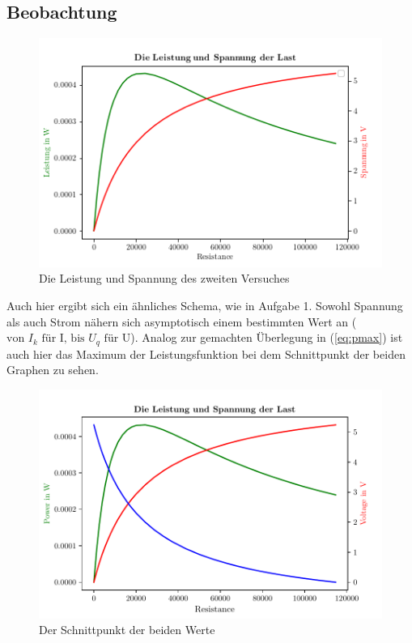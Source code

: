 \documentclass{scrarticle}
\begin{document}
\subsection{Beobachtung}
\begin{figure}
  \begin{center}
  \includegraphics[scale=0.5]{pw_volt2.png}
  \caption{Die Leistung und Spannung des zweiten Versuches}
  \end{center}
\end{figure}
Auch hier ergibt sich ein ähnliches Schema, wie in Aufgabe 1. Sowohl Spannung als auch Strom nähern sich asymptotisch einem bestimmten Wert an ($\text{von }I_k\text{ für I, bis }U_q\text{ für U}$).
Analog zur gemachten Überlegung in (\ref{eq:pmax}) ist auch hier das Maximum der Leistungsfunktion bei dem Schnittpunkt der beiden Graphen zu sehen.
\begin{figure}
  \begin{center}
\includegraphics[scale=0.5]{pw_volt_rsjp2.pdf}
\caption{Der Schnittpunkt der beiden Werte}
  \end{center}
\end{figure}
\end{document}
